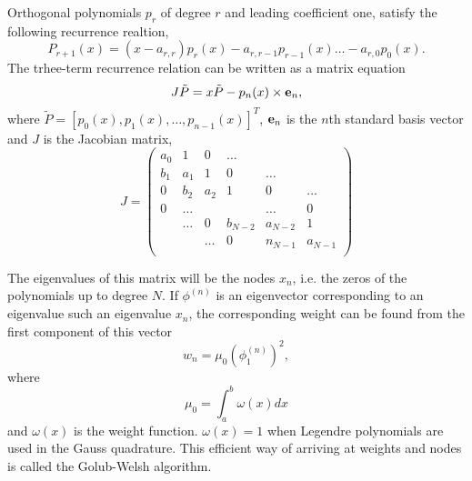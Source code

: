     Orthogonal polynomials $p_r$ of degree $r$ and 
    leading coefficient one, satisfy the following recurrence realtion,
    \begin{equation}
        P_{r+1}(x) = (x - a_{r,r})p_r(x) - a_{r,r-1}p_{r-1}(x) \dots -a_{r,0}p_0(x).
    \end{equation}
    The trhee-term recurrence relation can be written as a matrix equation
    \begin{equation}
        J\tilde{P} = x\tilde{P} - p_n(x) \times \vb{e}_n,
    \end{equation}
    where $\tilde{P} = [p_0(x),p_1(x),\dots,p_{n-1}(x)]^T$, $\vb{e}_n$ is the $n$th 
    standard basis vector and $J$ is the Jacobian matrix,
    \begin{equation}
        J = \begin{pmatrix}
            a_0 &    1  &    0  & \dots   &         & \\
            b_1 &  a_1  &    1  &    0    & \dots   & \\
            0   &  b_2  &   a_2 &    1    &    0    & \dots\\
            0   & \dots &       &         & \dots   & 0 \\
                & \dots &   0   & b_{N-2} & a_{N-2} & 1 \\
                &       & \dots &      0  & n_{N-1} & a_{N-1} \\
        \end{pmatrix}
    \end{equation}

    The eigenvalues of this matrix will be the nodes $x_n$, i.e. the zeros of the 
    polynomials up to degree $N$. If $\phi^{(n)}$ is an eigenvector corresponding to 
    an eigenvalue such an eigenvalue $x_n$, the corresponding weight can be found 
    from the first component of this vector
    \begin{equation}
        w_n = \mu_0 \left(\phi_1^{(n)} \right)^2,
    \end{equation}
    where 
    \begin{equation*}
        \mu_0 = \int_a^b \omega(x) dx
    \end{equation*}
    and $\omega(x)$ is the weight function. $\omega(x) = 1$ when Legendre polynomials
    are used in the Gauss quadrature. This efficient way of arriving at weights and 
    nodes is called the Golub-Welsh algorithm\cite{golub1969calculation}.
   
